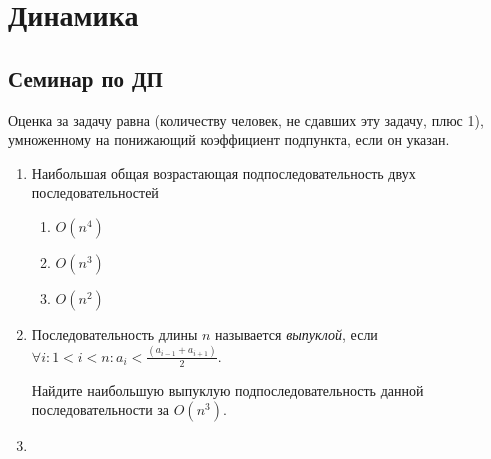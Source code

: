 \chapter{Динамика}

\section{Семинар по ДП} 

Оценка за задачу равна (количеству человек, не сдавших эту задачу, плюс 1), умноженному на понижающий коэффициент подпункта, если он указан.

\begin{enumerate}
\item Наибольшая общая возрастающая подпоследовательность 
двух последовательностей
    \begin{enumerate}
    \item $O(n^4)$
    \item $O(n^3)$
    \item $O(n^2)$
    \end{enumerate}
\item
Последовательность длины $n$ называется {\it выпуклой}, 
если 
$\forall i \colon 1 < i < n \colon a_i < \frac{(a_{i - 1} + a_{i + 1})}{2}$. 

Найдите наибольшую выпуклую подпоследовательность данной 
последовательности за $O(n ^ 3)$.

\item


\end{enumerate}
